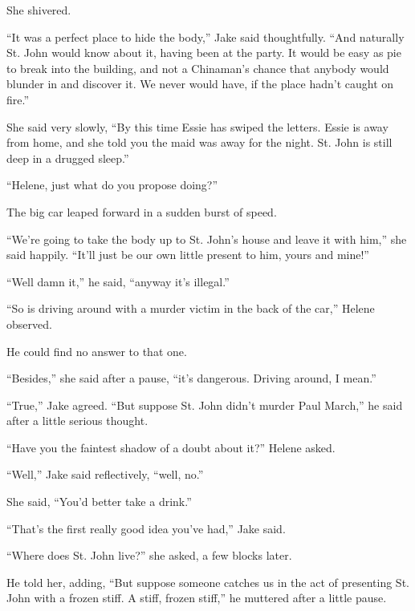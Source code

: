 \documentclass{novel}
\begin{document}
She shivered.

“It was a perfect place to hide the body,” Jake said thoughtfully. “And naturally St. John would know about it, having been at the party. It would be easy as pie to break into the building, and not a Chinaman’s chance that anybody would blunder in and discover it. We never would have, if the place hadn’t caught on fire.”

She said very slowly, “By this time Essie has swiped the letters. Essie is away from home, and she told you the maid was away for the night. St. John is still deep in a drugged sleep.”

“Helene, just what do you propose doing?”

The big car leaped forward in a sudden burst of speed.

“We’re going to take the body up to St. John’s house and leave it with him,” she said happily. “It’ll just be our own little present to him, yours and mine!”

\begin{ChapterStart}
\vspace{3\nbs}
\end{ChapterStart}

“Well damn it,” he said, “anyway it’s illegal.”

“So is driving around with a murder victim in the back of the car,” Helene observed.

He could find no answer to that one.

“Besides,” she said after a pause, “it’s dangerous. Driving around, I mean.”

“True,” Jake agreed. “But suppose St. John didn’t murder Paul March,” he said after a little serious thought.

“Have you the faintest shadow of a doubt about it?” Helene asked.

“Well,” Jake said reflectively, “well, no.”

She said, “You’d better take a drink.”

“That’s the first really good idea you’ve had,” Jake said.

“Where does St. John live?” she asked, a few blocks later.

He told her, adding, “But suppose someone catches us in the act of presenting St. John with a frozen stiff. A stiff, frozen stiff,” he muttered after a little pause.
\end{document}
